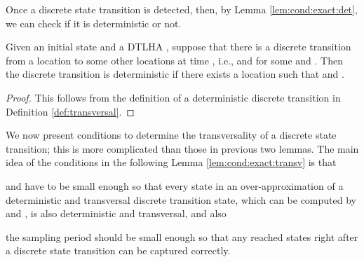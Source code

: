 Once a discrete state transition is detected, then, by Lemma \ref{lem:cond:exact:det}, we can check if it is deterministic or not.


\begin{lem} \label{lem:cond:exact:det}
Given an initial state  and a DTLHA ,
suppose that there is a discrete transition from a location  to some other locations at time , i.e.,  and  for some  and . 
Then the discrete transition is deterministic if there exists a location  such that  and .
\end{lem}\begin{proof}
This follows from the definition of a deterministic discrete transition in Definition \ref{def:transversal}.
\end{proof}


We now present conditions to determine the transversality of a discrete state transition; this is more complicated than those in previous two lemmas.
The main idea of the conditions in the following Lemma \ref{lem:cond:exact:transv} is that 
\begin{inparaenum}[(i)]
	\item  and  have to be small enough so that every state in an over-approximation of a deterministic and transversal discrete transition state, which can be computed by  and , is  also deterministic and transversal, and also
	\item the sampling period  should be small enough so that any reached states right after a discrete state transition can be captured correctly. 
\end{inparaenum}


